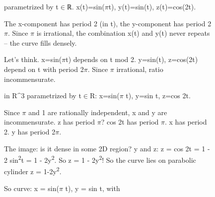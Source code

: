 \begin{figure}[t]
\noindent
\begin{reasoncol}[equal height group=reasX1]
  \par\vspace{1pt}
  \caret{}\par\vspace{4pt}
  \raggedright {} parametrized by t\(\in\)ℝ. x(t)=sin(\(\pi\)t), y(t)=sin(t), z(t)=cos(2t).\par
  The x-component has period 2 (in t), the y-component has period 2\(\pi\). Since \(\pi\) is irrational, the combination x(t) and y(t) never repeats -- the curve fills densely.\par
  Let's think. x=sin(\(\pi\)t) depends on t mod 2. y=sin(t), z=cos(2t) depend on t with period 2\(\pi\). Since \(\pi\) irrational, ratio incommensurate.\par\vspace{3pt}\elide
\end{reasoncol}\hspace{\columnsep}%
\vspace{12pt}
\begin{reasoncol}[equal height group=reasX1]
  \par\vspace{1pt}
  \caret{}\par\vspace{4pt}
  \raggedright {} in R\textasciicircum{}3 parametrized by t\(\in\)R: x=sin(\(\pi\) t), y=sin t, z=cos 2t.\par
  Since \(\pi\) and 1 are rationally independent, x and y are incommensurate. z has period \(\pi\)? cos 2t has period \(\pi\). x has period 2. y has period 2\(\pi\).\par
  The image: is it dense in some 2D region? y and z: z = cos 2t = 1 - 2 sin\textsuperscript{2}t = 1 - 2y\textsuperscript{2}. So z = 1 - 2y\textsuperscript{2}! So the curve lies on parabolic cylinder z = 1-2y\textsuperscript{2}.\par
  So curve: x = sin(\(\pi\) t), y = sin t, with\par\vspace{3pt}\elide
\end{reasoncol}\hspace{\columnsep}%
\begin{reasoncol}[equal height group=reasX1]
  \par\vspace{1pt}

\end{reasoncol}
\end{figure}
